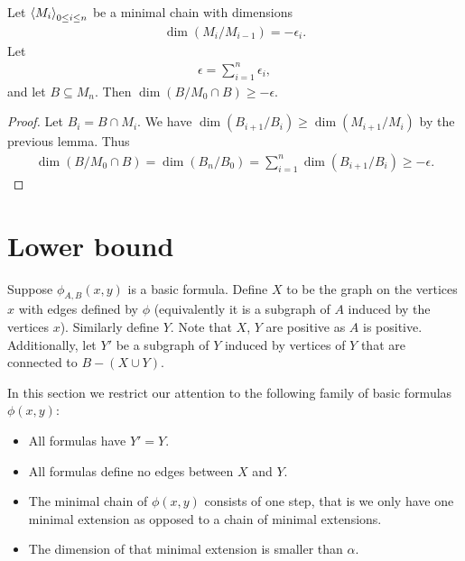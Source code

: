 \begin{Lemma} \label{chain_intersect}
  Let  $\left\langle M_i \right\rangle_{0 \leq i \leq n}$ be  a minimal chain with dimensions
  \begin{align*}
    \dim(M_i/M_{i-1}) = -\epsilon_i.
  \end{align*}
  Let
  \begin{align*}
    \epsilon = \sum_{i = 1}^{n}\epsilon_i,  
  \end{align*}
  and let $B \subseteq M_n$.
  Then $\dim (B / M_0 \cap B) \geq -\epsilon$.
\end{Lemma}

\begin{proof}
  Let $B_i = B \cap M_i$.
  We have $\dim (B_{i+1}/B_i) \geq \dim (M_{i+1}/M_i)$ by the previous lemma.
  Thus
  \begin{align*}
    \dim (B / M_0 \cap B) = \dim (B_n / B_0) = \sum_{i = 1}^n \dim (B_{i+1}/B_i) \geq -\epsilon.
  \end{align*}
\end{proof}

\section{Lower bound}
\begin{Definition} \label{def_basic}
  Suppose $\phi_{A,B}(x, y)$ is a basic formula.
  Define $X$ to be the graph on the vertices $x$ with edges defined by $\phi$
  (equivalently it is a subgraph of $A$ induced by the vertices $x$).
  Similarly define $Y$.
  Note that $X$, $Y$ are positive as $A$ is positive.
  Additionally, let $Y'$ be a subgraph of $Y$ induced by vertices of $Y$ that are connected to $B - (X \cup Y)$.
\end{Definition}

In this section we restrict our attention to the following family of basic formulas $\phi(x,y)$:
\begin{itemize}
\item All formulas have $Y' = Y$.%
\item All formulas define no edges between $X$ and $Y$.
\item The minimal chain of $\phi(x,y)$ consists of one step, that is we only have one minimal extension as opposed to a chain of minimal extensions.
\item The dimension of that minimal extension is smaller than $\alpha$.
\end{itemize}

